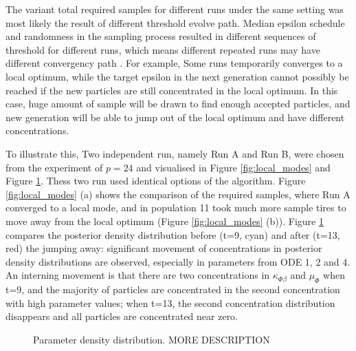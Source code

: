 The variant total required samples for different runs under the same setting was most likely the result of different threshold evolve path. Median epsilon schedule and randomness in the sampling process resulted in different sequences of threshold for different runs, which means different repeated runs may have different convergency path \cite{threshold}. For example, Some runs temporarily converges to a local optimum, while the target epsilon in the next generation cannot possibly be reached if the new particles are still concentrated in the local optimum. In this case, huge amount of sample will be drawn to find enough accepted particles, and new generation will be able to jump out of the local optimum and have different concentrations. 

To illustrate this, Two independent run, namely Run A and Run B, were chosen from the experiment of $p=24$ and visualised in Figure \ref{fig:local_modes} and Figure \ref{fig:local_para}. Thess two run used identical options of the algorithm. Figure \ref{fig:local_modes} (a) shows the comparison of the required samples, where Run A converged to a local mode, and in population 11 took much more sample tires to move away from the local optimum (Figure \ref{fig:local_modes} (b)). Figure \ref{fig:local_para} compares the posterior density distribution before (t=9, cyan) and after (t=13, red) the jumping away: significant movement of concentrations in posterior density distributions are observed, especially in parameters from ODE 1, 2 and 4. An interning movement is that there are two concentrations in $\kappa_{\Phi\beta}$ and $\mu_\Phi$ when t=9, and the majority of particles are concentrated in the second concentration with high parameter values; when t=13, the second concentration distribution disappears and all particles are concentrated near zero.


\begin{figure}[t]
    \begin{center}
    \end{center}

    \caption[TODO]{Parameter density distribution. MORE DESCRIPTION}
    \label{fig:local_para}
\end{figure}

